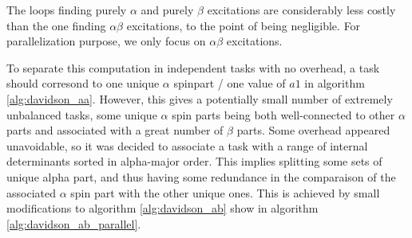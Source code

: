 \documentclass[./thesis.tex]{subfiles}
\begin{document}
The loops finding purely $\alpha$ and purely $\beta$ excitations are considerably less costly than the one finding $\alpha \beta$ excitations, to the point of being negligible. For parallelization purpose, we only focus on $\alpha \beta$ excitations.

To separate this computation in independent tasks with no overhead, a task should corresond to one unique $\alpha$ spinpart / one value of $a1$ in algorithm \ref{alg:davidson_aa}. However, this gives a potentially small number of extremely unbalanced tasks, some unique $\alpha$ spin parts being both well-connected to other $\alpha$ parts and associated with a great number of $\beta$ parts.
Some overhead appeared unavoidable, so it was decided to associate a task with a range of internal determinants sorted in alpha-major order. This implies splitting some sets of unique alpha part, and thus having some redundance in the comparaison of the associated $\alpha$ spin part with the other unique ones.
This is achieved by small modifications to algorithm \ref{alg:davidson_ab} show in algorithm \ref{alg:davidson_ab_parallel}.
\end{document}
